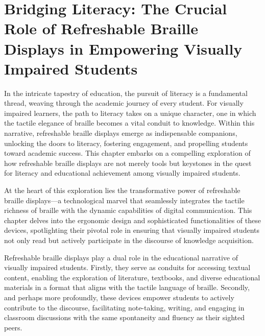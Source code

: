 \hypertarget{braille-first-devices}{}\chapter[\raggedright Bridging Literacy:\hfill\break  The Crucial Role of Refreshable Braille Displays in Empowering\hfill\break  Visually Impaired Students]{Bridging Literacy: The Crucial Role of Refreshable Braille Displays in Empowering Visually Impaired Students}\label{braille-first-devices}
\noindent\makebox[\linewidth]{\rule{\linewidth}{0.4pt}}
{\let\clearpage\relax\localtableofcontents\let\clearpage\relax\locallistoftables}\newpage
{}
In the intricate tapestry of education, the pursuit of literacy is a fundamental thread, weaving through the academic journey of every student. For visually impaired learners, the path to literacy takes on a unique character, one in which the tactile elegance of braille becomes a vital conduit to knowledge. Within this narrative, refreshable braille displays emerge as indispensable companions, unlocking the doors to literacy, fostering engagement, and propelling students toward academic success. This chapter embarks on a compelling exploration of how refreshable braille displays are not merely tools but keystones in the quest for literacy and educational achievement among visually impaired students.

At the heart of this exploration lies the transformative power of refreshable braille displays—a technological marvel that seamlessly integrates the tactile richness of braille with the dynamic capabilities of digital communication. This chapter delves into the ergonomic design and sophisticated functionalities of these devices, spotlighting their pivotal role in ensuring that visually impaired students not only read but actively participate in the discourse of knowledge acquisition.

Refreshable braille displays play a dual role in the educational narrative of visually impaired students. Firstly, they serve as conduits for accessing textual content, enabling the exploration of literature, textbooks, and diverse educational materials in a format that aligns with the tactile language of braille. Secondly, and perhaps more profoundly, these devices empower students to actively contribute to the discourse, facilitating note-taking, writing, and engaging in classroom discussions with the same spontaneity and fluency as their sighted peers.

